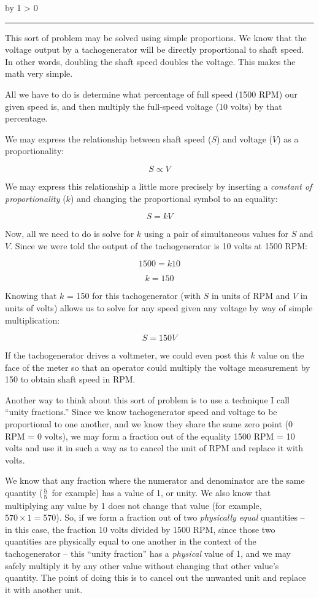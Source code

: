 \documentclass[12pt,a4paper]{article}
\def\notes{
           \advance\explnum by 1
           \ifnum \explnum > 0
                \hrule
                \vskip 3pt
                \leftline{Notes \the\explnum}
                \vskip 3pt \fi}
\begin{document}
\vskip 10pt \filbreak 





\notes{} 

This sort of problem may be solved using simple proportions.  We know that the voltage output by a tachogenerator will be directly proportional to shaft speed.  In other words, doubling the shaft speed doubles the voltage.  This makes the math very simple.

All we have to do is determine what percentage of full speed (1500 RPM) our given speed is, and then multiply the full-speed voltage (10 volts) by that percentage.

We may express the relationship between shaft speed ($S$) and voltage ($V$) as a proportionality:

$$S \propto V$$

We may express this relationship a little more precisely by inserting a {\it constant of proportionality} ($k$) and changing the proportional symbol to an equality:

$$S = kV$$

Now, all we need to do is solve for $k$ using a pair of simultaneous values for $S$ and $V$.  Since we were told the output of the tachogenerator is 10 volts at 1500 RPM:

$$1500 = k 10$$

$$k = 150$$

Knowing that $k$ = 150 for this tachogenerator (with $S$ in units of RPM and $V$ in units of volts) allows us to solve for any speed given any voltage by way of simple multiplication:

$$S = 150 V$$

If the tachogenerator drives a voltmeter, we could even post this $k$ value on the face of the meter so that an operator could multiply the voltage measurement by 150 to obtain shaft speed in RPM.

\vskip 10pt

Another way to think about this sort of problem is to use a technique I call ``unity fractions.''  Since we know tachogenerator speed and voltage to be proportional to one another, and we know they share the same zero point (0 RPM = 0 volts), we may form a fraction out of the equality 1500 RPM = 10 volts and use it in such a way as to cancel the unit of RPM and replace it with volts.  

We know that any fraction where the numerator and denominator are the same quantity ($5 \over 5$ for example) has a value of 1, or unity.  We also know that multiplying any value by 1 does not change that value (for example, $570 \times 1 = 570$).  So, if we form a fraction out of two {\it physically equal} quantities -- in this case, the fraction 10 volts divided by 1500 RPM, since those two quantities are physically equal to one another in the context of the tachogenerator -- this ``unity fraction'' has a {\it physical} value of 1, and we may safely multiply it by any other value without changing that other value's quantity.  The point of doing this is to cancel out the unwanted unit and replace it with another unit.
\end{document}
